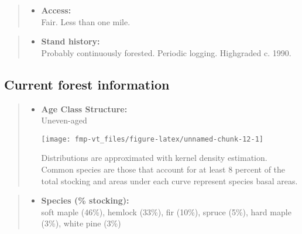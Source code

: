\documentclass[]{tufte-handout}
\providecommand{\tightlist}{%
  \setlength{\itemsep}{0pt}\setlength{\parskip}{0pt}}
\begin{document}
\begin{quote}
\begin{itemize}
\tightlist
\item
  \textbf{Access:}\\
  \vspace{2pt} Fair. Less than one mile.
\end{itemize}
\end{quote}

\begin{quote}
\begin{itemize}
\tightlist
\item
  \textbf{Stand history:}\\
  \vspace{2pt} Probably continuously forested. Periodic logging.
  Highgraded c. 1990.
\end{itemize}
\end{quote}

\subsection{Current forest
information}\label{current-forest-information-2}

\begin{quote}
\begin{itemize}
\tightlist
\item
  \textbf{Age Class Structure:}\\
  \vspace{2pt} Uneven-aged\\

  \begin{marginfigure}
  \texttt{[image: fmp-vt\_files/figure-latex/unnamed-chunk-12-1]} \caption[Distributions are approximated with kernel density estimation]{Distributions are approximated with kernel density estimation. Common species are those that account for at least 8 percent of the total stocking and areas under each curve represent species basal areas.}\label{fig:unnamed-chunk-12}
  \end{marginfigure}
\end{itemize}
\end{quote}

\begin{quote}
\begin{itemize}
\tightlist
\item
  \textbf{Species (\% stocking):}\\
  \vspace{2pt} soft maple (46\%), hemlock (33\%), fir (10\%), spruce
  (5\%), hard maple (3\%), white pine (3\%)
\end{itemize}
\end{quote}
\end{document}

